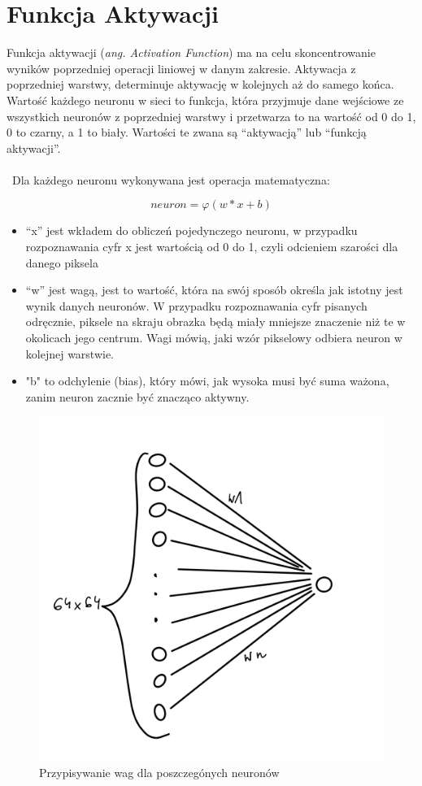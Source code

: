 \documentclass[openright]{xmgr}
\begin{document}
\section{Funkcja Aktywacji  \label{s:dsssl}}

\indent \indent Funkcja aktywacji  (\textit{ang. Activation Function}) ma na celu skoncentrowanie wyników poprzedniej operacji liniowej w danym zakresie.
Aktywacja z poprzedniej warstwy, determinuje aktywację w kolejnych aż do samego końca. Wartość każdego neuronu w sieci to funkcja, która przyjmuje dane wejściowe ze wszystkich neuronów z poprzedniej warstwy i przetwarza to na wartość od 0 do 1, 0 to czarny, a 1 to biały. Wartości te zwana są “aktywacją” lub “funkcją aktywacji”. \\\\\ Dla każdego neuronu wykonywana jest operacja matematyczna:

\begin{equation}
neuron  = φ (w * x + b)
\end{equation}

\begin{itemize}
\item “x” jest wkładem do obliczeń pojedynczego neuronu, w przypadku rozpoznawania cyfr x jest wartością od 0 do 1, czyli odcieniem szarości dla danego piksela
\item “w” jest wagą, jest to wartość, która na swój sposób określa jak istotny jest wynik danych neuronów. W przypadku rozpoznawania cyfr pisanych odręcznie, piksele na skraju obrazka będą miały mniejsze znaczenie niż te w okolicach jego centrum. Wagi mówią, jaki wzór pikselowy odbiera neuron w kolejnej warstwie.
\item "b" to odchylenie (bias), który mówi, jak wysoka musi być suma ważona, zanim neuron zacznie być znacząco aktywny.
\end{itemize}

\begin{figure}[!tbh]
\centering
\includegraphics[width=.8\hsize]{fig/3}
\caption{Przypisywanie wag dla poszczegónych neuronów\label{RYS.3}}
\end{figure}
\end{document}
